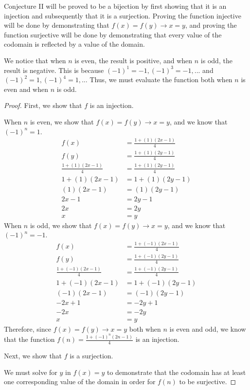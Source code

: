 \documentclass[11pt,titlepage]{article}		%
\theoremstyle{theorem}
\begin{document}
Conjecture II will be proved to be a bijection by first showing that it is an injection and subsequently that it is a surjection. Proving the function injective will be done by demonstrating that $f(x)=f(y) \to x=y$, and proving the function surjective will be done by demonstrating that every value of the codomain is reflected by a value of the domain.

We notice that when $n$ is even, the result is positive, and when $n$ is odd, the result is negative. This is because $(-1)^1 = -1, (-1)^3=-1,...$ and $(-1)^2=1, (-1)^4=1,..$. Thus, we must evaluate the function both when $n$ is even and when $n$ is odd.


\begin{proof}
First, we show that $f$ is an injection.

When $n$ is even, we show that $f(x)=f(y) \to x=y$, and we know that $(-1)^n = 1$.
\begin{align}
f(x)&=\frac{1+(1)(2x-1)}{4}\\
f(y)&=\frac{1+(1)(2y-1)}{4}\\
\frac{1+(1)(2x-1)}{4} &= \frac{1+(1)(2y-1)}{4}\\
1+(1)(2x-1) &= 1+(1)(2y-1)\\
(1)(2x-1) &= (1)(2y-1)\\
2x-1 &= 2y-1\\
2x&=2y\\
x&=y
\end{align}
When $n$ is odd, we show that $f(x)=f(y) \to x=y$, and we know that $(-1)^n = -1$.
\begin{align}
f(x)&=\frac{1+(-1)(2x-1)}{4}\\
f(y)&=\frac{1+(-1)(2y-1)}{4}\\
\frac{1+(-1)(2x-1)}{4} &= \frac{1+(-1)(2y-1)}{4}\\
1+(-1)(2x-1) &= 1+(-1)(2y-1)\\
(-1)(2x-1) &= (-1)(2y-1)\\
-2x+1 &= -2y+1\\
-2x&=-2y\\
x&=y
\end{align}
Therefore, since $f(x)=f(y) \to x=y$ both when $n$ is even and odd, we know that the function $f(n) = \frac{1+(-1)^n (2n-1)}{4}$ is an injection.


Next, we show that $f$ is a surjection.

We must solve for $y$ in $f(x) =y$ to demonstrate that the codomain has at least one corresponding value of the domain in order for $f(n)$ to be surjective. 


\end{proof}
\end{document}
